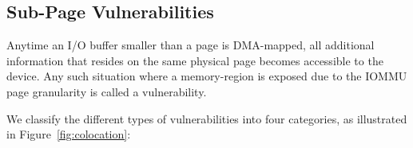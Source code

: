 



\subsection{Sub-Page Vulnerabilities}\label{sec:subpage}

Anytime an I/O buffer smaller than a page is DMA-mapped, all additional information that resides on the same physical page becomes accessible to the device. Any such situation where a memory-region is exposed due to the IOMMU page granularity is called a \subpage vulnerability.

We classify the different types of \subpage vulnerabilities into four categories, as illustrated in Figure~\ref{fig:colocation}:

